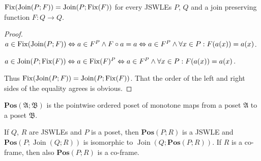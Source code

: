\begin{lem}
\label{join-fix-inter}$\operatorname{Fix}(\operatorname{Join}(P;F))=\operatorname{Join}(P;\operatorname{Fix}(F))$
for every JSWLEs $P$, $Q$ and a join preserving function $F:Q\rightarrow Q$.\end{lem}
\begin{proof}
$a\in\operatorname{Fix}(\operatorname{Join}(P;F))\Leftrightarrow a\in F^{P}\wedge F\circ a=a\Leftrightarrow a\in F^{P}\wedge\forall x\in P:F(a(x))=a(x)$.

$a\in\operatorname{Join}(P;\operatorname{Fix}(F))\Leftrightarrow a\in\operatorname{Fix}(F)^{P}\Leftrightarrow a\in F^{P}\wedge\forall x\in P:F(a(x))=a(x)$.

Thus $\operatorname{Fix}(\operatorname{Join}(P;F))=\operatorname{Join}(P;\operatorname{Fix}(F))$.
That the order of the left and right sides of the equality agrees
is obvious.\end{proof}
\begin{defn}
$\mathbf{Pos}(\mathfrak{A};\mathfrak{B})$ is the pointwise ordered
poset of monotone maps from a poset $\mathfrak{A}$ to a poset $\mathfrak{B}$.\end{defn}
\begin{lem}
\label{join-pos-interch}If $Q$, $R$ are JSWLEs and $P$ is a poset,
then $\mathbf{Pos}(P;R)$ is a JSWLE and $\mathbf{Pos}(P;\operatorname{Join}(Q;R))$
is isomorphic to $\operatorname{Join}\left(Q;\mathbf{Pos}(P;R)\right)$.
If $R$ is a co-frame, then also $\mathbf{Pos}(P;R)$ is a co-frame.
\end{lem}
